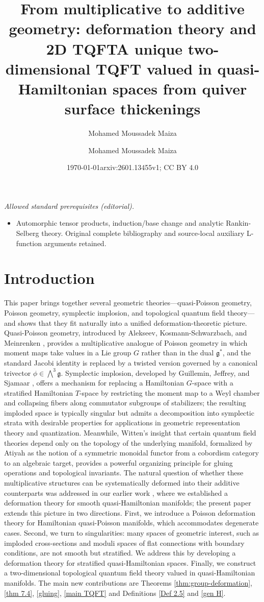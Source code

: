 \documentclass[reqno]{amsart}
\title{From multiplicative to additive geometry: deformation theory and 2D TQFT}
\date{\today}
\author{Mohamed Moussadek Maiza}
\title{A unique two-dimensional TQFT valued in quasi-Hamiltonian spaces from quiver surface thickenings}
\author{Mohamed Moussadek Maiza}
\date{arxiv:2601.13455v1; CC BY 4.0}
\theoremstyle{plain}
\theoremstyle{definition}
\newcommand{\g}{\mathfrak{g}}
\begin{document}
\maketitle
\noindent\textit{Allowed standard prerequisites (editorial).}\begin{itemize}
\item Automorphic tensor products, induction/base change and analytic Rankin-Selberg theory. Original complete bibliography and source-local auxiliary L-function arguments retained.
\end{itemize}\medskip
\section{Introduction}

This paper brings together several geometric theories---quasi-Poisson geometry, Poisson geometry, symplectic implosion, and topological quantum field theory---and shows that they fit naturally into a unified deformation-theoretic picture. Quasi-Poisson geometry, introduced by Alekseev, Kosmann-Schwarzbach, and Meinrenken \cite{alekseev2002quasi}, provides a multiplicative analogue of Poisson geometry in which moment maps take values in a Lie group $G$ rather than in the dual $\g^*$, and the standard Jacobi identity is replaced by a twisted version governed by a canonical trivector $\phi \in \bigwedge^3 \g$. Symplectic implosion, developed by Guillemin, Jeffrey, and Sjamaar \cite{guillemin2002}, offers a mechanism for replacing a Hamiltonian $G$-space with a stratified Hamiltonian $T$-space by restricting the moment map to a Weyl chamber and collapsing fibers along commutator subgroups of stabilizers; the resulting imploded space is typically singular but admits a decomposition into symplectic strata with desirable properties for applications in geometric representation theory and quantization. Meanwhile, Witten's insight \cite{witten1988} that certain quantum field theories depend only on the topology of the underlying manifold, formalized by Atiyah \cite{atiyah1988} as the notion of a symmetric monoidal functor from a cobordism category to an algebraic target, provides a powerful organizing principle for gluing operations and topological invariants. The natural question of whether these multiplicative structures can be systematically deformed into their additive counterparts was addressed in our earlier work \cite{JMM2025deformations}, where we established a deformation theory for smooth quasi-Hamiltonian manifolds; the present paper extends this picture in two directions. First, we introduce a Poisson deformation theory for Hamiltonian quasi-Poisson manifolds, which accommodates degenerate cases. Second, we turn to singularities: many spaces of geometric interest, such as imploded cross-sections and moduli spaces of flat connections with boundary conditions, are not smooth but stratified. We address this by developing a deformation theory for stratified quasi-Hamiltonian spaces. Finally, we construct a two-dimensional topological quantum field theory valued in quasi-Hamiltonian manifolds. The main new contributions are Theorems \ref{thm:group-deformation}, \ref{thm 7.4}, \ref{gluing}, \ref{main TQFT} and Definitions \ref{Def 2.5} and \ref{gen H}.
\end{document}
